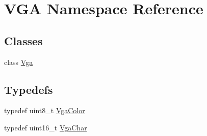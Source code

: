 \hypertarget{namespace_v_g_a}{}\section{V\+GA Namespace Reference}
\label{namespace_v_g_a}
\subsection*{Classes}
\begin{DoxyCompactItemize}
\item 
class \hyperlink{class_v_g_a_1_1_vga}{Vga}
\end{DoxyCompactItemize}
\subsection*{Typedefs}
\begin{DoxyCompactItemize}
\item 
typedef uint8\+\_\+t \hyperlink{namespace_v_g_a_afa3882cddefd08a3f33aaf6fcbcbcd7f}{Vga\+Color}
\item 
typedef uint16\+\_\+t \hyperlink{namespace_v_g_a_adb876ce4a116e09f39708ca16ef25f74}{Vga\+Char}
\end{DoxyCompactItemize}
